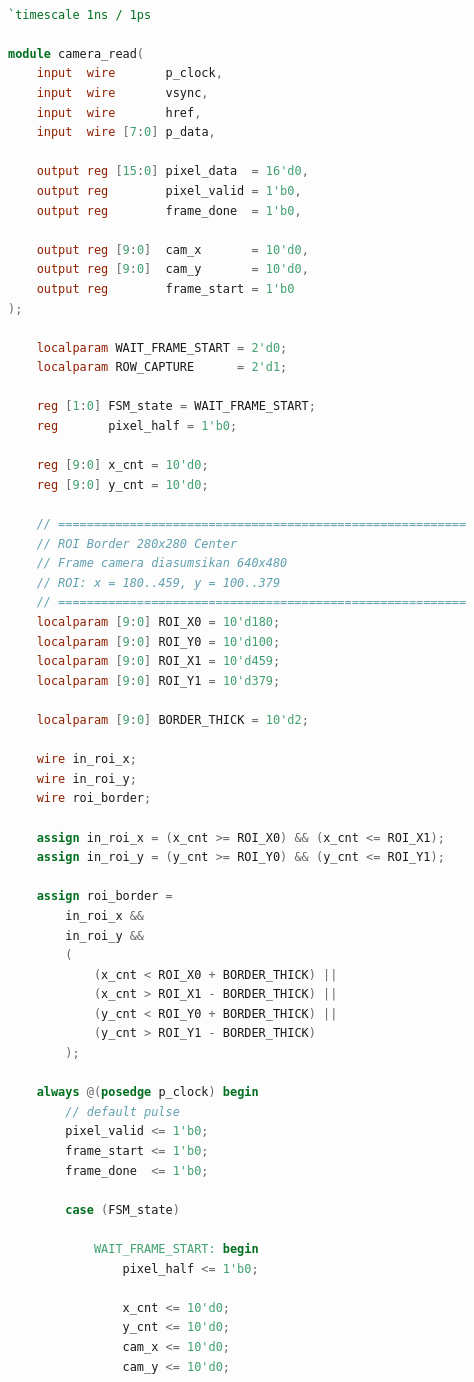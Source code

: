     \begin{lstlisting}[language=Verilog, title={Kode Pixel Capture untuk OV7670}, label={code:ov7670}]

`timescale 1ns / 1ps

module camera_read(
    input  wire       p_clock,
    input  wire       vsync,
    input  wire       href,
    input  wire [7:0] p_data,

    output reg [15:0] pixel_data  = 16'd0,
    output reg        pixel_valid = 1'b0,
    output reg        frame_done  = 1'b0,

    output reg [9:0]  cam_x       = 10'd0,
    output reg [9:0]  cam_y       = 10'd0,
    output reg        frame_start = 1'b0
);

    localparam WAIT_FRAME_START = 2'd0;
    localparam ROW_CAPTURE      = 2'd1;

    reg [1:0] FSM_state = WAIT_FRAME_START;
    reg       pixel_half = 1'b0;

    reg [9:0] x_cnt = 10'd0;
    reg [9:0] y_cnt = 10'd0;

    // =========================================================
    // ROI Border 280x280 Center
    // Frame camera diasumsikan 640x480
    // ROI: x = 180..459, y = 100..379
    // =========================================================
    localparam [9:0] ROI_X0 = 10'd180;
    localparam [9:0] ROI_Y0 = 10'd100;
    localparam [9:0] ROI_X1 = 10'd459;
    localparam [9:0] ROI_Y1 = 10'd379;

    localparam [9:0] BORDER_THICK = 10'd2;

    wire in_roi_x;
    wire in_roi_y;
    wire roi_border;

    assign in_roi_x = (x_cnt >= ROI_X0) && (x_cnt <= ROI_X1);
    assign in_roi_y = (y_cnt >= ROI_Y0) && (y_cnt <= ROI_Y1);

    assign roi_border =
        in_roi_x &&
        in_roi_y &&
        (
            (x_cnt < ROI_X0 + BORDER_THICK) ||
            (x_cnt > ROI_X1 - BORDER_THICK) ||
            (y_cnt < ROI_Y0 + BORDER_THICK) ||
            (y_cnt > ROI_Y1 - BORDER_THICK)
        );

    always @(posedge p_clock) begin
        // default pulse
        pixel_valid <= 1'b0;
        frame_start <= 1'b0;
        frame_done  <= 1'b0;

        case (FSM_state)

            WAIT_FRAME_START: begin
                pixel_half <= 1'b0;

                x_cnt <= 10'd0;
                y_cnt <= 10'd0;
                cam_x <= 10'd0;
                cam_y <= 10'd0;


\end{lstlisting}
